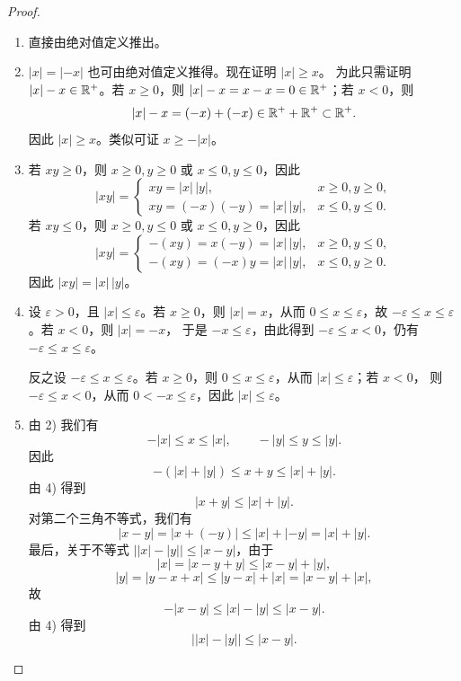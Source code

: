\begin{proof}
\begin{enumerate}[label=\arabic*)]
  \item 直接由绝对值定义推出。

  \item \(|x|=|-x|\) 也可由绝对值定义推得。现在证明 \(|x|\geq x\)。
  为此只需证明 \(|x|-x\in\mathbb{R}^+\)。若 \(x\geq0\)，则
  \(|x|-x=x-x=0\in\mathbb{R}^+\)；若 \(x<0\)，则
  \[
  |x|-x=(-x)+(-x)\in\mathbb{R}^++\mathbb{R}^+\subset\mathbb{R}^+.
  \]
  因此 \(|x|\geq x\)。类似可证 \(x\geq-|x|\)。

  \item 若 \(xy\geq0\)，则 \(x\geq0,y\geq0\) 或 \(x\leq0,y\leq0\)，因此
  \[
  |xy|=\begin{cases}
  xy=|x|\,|y|,&x\geq0, y\geq0,\\
  xy=(-x)(-y)=|x|\,|y|,&x\leq0, y\leq0.
  \end{cases}
  \]
  若 \(xy\leq0\)，则 \(x\geq0,y\leq0\) 或 \(x\leq0,y\geq0\)，因此
  \[
  |xy|=\begin{cases}
  -(xy)=x(-y)=|x|\,|y|,&x\geq0, y\leq0,\\
  -(xy)=(-x)y=|x|\,|y|,&x\leq0, y\geq0.
  \end{cases}
  \]
  因此 \(|xy|=|x|\,|y|\)。

  \item 设 \(\varepsilon>0\)，且 \(|x|\leq\varepsilon\)。若 \(x\geq0\)，则
  \(|x|=x\)，从而 \(0\leq x\leq\varepsilon\)，故
  \(-\varepsilon\leq x\leq\varepsilon\)。若 \(x<0\)，则 \(|x|=-x\)，
  于是 \(-x\leq\varepsilon\)，由此得到
  \(-\varepsilon\leq x<0\)，仍有
  \(-\varepsilon\leq x\leq\varepsilon\)。

  反之设 \(-\varepsilon\leq x\leq\varepsilon\)。若 \(x\geq0\)，则
  \(0\leq x\leq\varepsilon\)，从而 \(|x|\leq\varepsilon\)；若 \(x<0\)，
  则 \(-\varepsilon\leq x<0\)，从而 \(0<-x\leq\varepsilon\)，因此
  \(|x|\leq\varepsilon\)。

  \item 由 2) 我们有
  \[
  -|x|\leq x\leq|x|,
  \qquad
  -|y|\leq y\leq|y|.
  \]
  因此
  \[
  -(|x|+|y|)\leq x+y\leq|x|+|y|.
  \]
  由 4) 得到
  \[
  |x+y|\leq|x|+|y|.
  \]
  对第二个三角不等式，我们有
  \[
  |x-y|=|x+(-y)|\leq|x|+|-y|=|x|+|y|.
  \]
  最后，关于不等式 \(\bigl||x|-|y|\bigr|\leq|x-y|\)，由于
  \[
  |x|=|x-y+y|\leq|x-y|+|y|,
  \]
  \[
  |y|=|y-x+x|\leq|y-x|+|x|=|x-y|+|x|,
  \]
  故
  \[
  -|x-y|\leq|x|-|y|\leq|x-y|.
  \]
  由 4) 得到
  \[
  \bigl||x|-|y|\bigr|\leq|x-y|.
  \]
\end{enumerate}
\end{proof}

